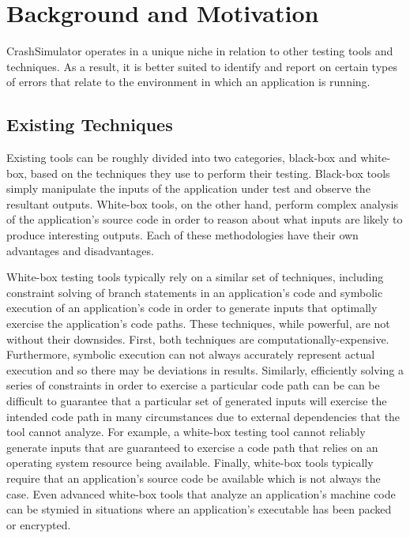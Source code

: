 \section{Background and Motivation}

    CrashSimulator operates in a unique niche in relation to other testing tools and techniques. As a result, it is
    better suited to identify and report on certain types of errors that relate to the environment in which an
    application is running.

    \subsection{Existing Techniques}

    Existing tools can be roughly divided into two categories, black-box and white-box, based on the techniques they
    use to perform their testing. Black-box tools simply manipulate the inputs of the application under test and
    observe the resultant outputs. White-box tools, on the other hand, perform complex analysis of the application's
    source code in order to reason about what inputs are likely to produce interesting outputs. Each of these
    methodologies have their own advantages and disadvantages.

    White-box testing tools typically rely on a similar set of techniques, including constraint solving of branch
    statements in an application's code and symbolic execution of an application's code in order to generate inputs
    that optimally exercise the application's code paths. These techniques, while powerful, are not without their
    downsides. First, both techniques are computationally-expensive. Furthermore, symbolic execution can not always
    accurately represent actual execution and so there may be deviations in results. Similarly, efficiently solving
    a series of constraints in order to exercise a particular code path can be can be difficult to guarantee that a
    particular set of generated inputs will exercise the intended code path in many circumstances due to external
    dependencies that the tool cannot analyze. For example, a white-box testing tool cannot reliably generate inputs
    that are guaranteed to exercise a code path that relies on an operating system resource being available.
    Finally, white-box tools typically require that an application's source code be available which is not always
    the case. Even advanced white-box tools that analyze an application's machine code can be stymied in situations
    where an application's executable has been packed or encrypted.

